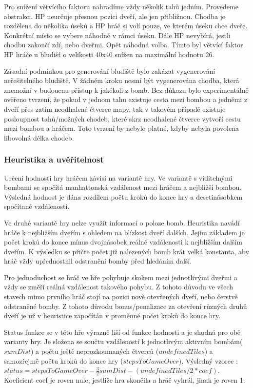 Pro snížení větvícího faktoru nahradíme vždy několik tahů jedním. Provedeme abstrakci. HP neurčuje přesnou pozici dveří, ale jen přibližnou. Chodba je rozdělena do několika úseků a HP hráč si volí pouze, ve kterém úseku chce dveře. Konkrétní místo se vybere náhodně v rámci úseku. Dále HP nevybírá, jestli chodbu zakončí zdí, nebo dveřmi. Opět náhodná volba. Tímto byl větvící faktor HP hráče u bludišť o velikosti 40x40 snížen na maximální hodnotu 26.

Zásadní podmínkou pro generování bludiště bylo zakázat vygenerování neřešitelného bludiště. V žádném kroku nesmí být vygenerována chodba, která znemožní v budoucnu přístup k jakékoli z bomb. Bez důkazu bylo experimentálně ověřeno tvrzení, že pokud v jednom tahu existuje cesta mezi bombou a jedněmi z dveří přes zatím neodhalené čtverce mapy, tak v takovém případě existuje posloupnost tahů/možných chodeb, které skrz neodhalené čtverce vytvoří cestu mezi bombou a hráčem. Toto tvrzení by nebylo platné, kdyby nebyla povolena libovolná délka chodeb.

\subsubsection{Heuristika a uvěřitelnost}

Určení hodnosti hry hráčem závisí na variantě hry. Ve variantě s viditelnými bombami se spočítá manhattonská vzdálenost mezi hráčem a nejbližší bombou. Výsledná hodnost je dána rozdílem počtu kroků do konce hry a desetinásobkem spočítané vzdálenosti.

Ve druhé variantě hry nelze využít informací o poloze bomb. Heuristika navádí hráče k nejbližším dveřím s ohledem na blízkost dveří dalších. Jejím základem je počet kroků do konce mínus dvojnásobek reálné vzdálenosti k nejbližším dalším dveřím. K výsledku se přičte počet již nalezených bomb krát velká konstanta, aby hráč vždy upřednostnil odstranění bomby před hledáním další.

Pro jednoduchost se hráč ve hře pohybuje skokem mezi jednotlivými dveřmi a vždy se změří reálná vzdálenost takového pohybu. Z tohoto důvodu ve všech stavech mimo prvního hráč stojí na pozici nově otevřených dveří, nebo čerstvě odstraněné bomby. Z tohoto důvodu bonus/penalizace za otevření různých druhů dveří je už v heuristice započítán v proměnné počet kroků do konce hry.

Status funkce se v této hře výrazně liší od funkce hodnosti a je shodná pro obě varianty hry. Je složena se součtu vzdáleností k jednotlivým aktivním bombám($sumDist$) a počtu ještě neprozkoumaných čtverců ($undefinedTiles$) a samozřejmě počtu kroků do konce hry ($stepsToGameOver$). Výsledný vzorec : $status = stepsToGameOver - \frac{3}{2}sumDist-(undefinedTiles / 2 * coef)$. Koeficient coef je roven nule, jestliže hra skončila a hráč vyhrál, jinak je roven 1. 

